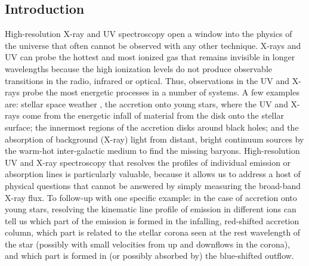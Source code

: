 \documentclass[12pt]{spieman}  %
\begin{document}
\begin{spacing}{1}

\section{Introduction}
\label{sect:intro}  %
High-resolution X-ray and UV spectroscopy open a window into the physics of the universe that often cannot be observed with any other technique. X-rays and UV can probe the hottest and most ionized gas that remains invisible in longer wavelengths because the high ionization levels do not produce observable transitions in the radio, infrared or optical. Thus, observations in the UV and X-rays probe the most energetic processes in a number of systems. A few examples are: stellar space weather \cite{2022AN....34320019B}, the accretion onto young stars, where the UV and X-rays come from the energetic infall of material from the disk onto the stellar surface; the innermost regions of the accretion disks around black holes; and the absorption of background (X-ray) light from distant, bright continuum sources by the warm-hot inter-galactic medium to find the missing baryons\cite{10.1117/12.2231193}. High-resolution UV and X-ray spectroscopy that resolves the profiles of individual emission or absorption lines is particularly valuable, because it allows us to address a host of physical questions that cannot be answered by simply measuring the broad-band X-ray flux.
To follow-up with one specific example: in the case of accretion onto young stars, resolving the kinematic line profile of emission in different ions can tell us which part of the emission is formed in the infalling, red-shifted accretion column, which part is related to the stellar corona seen at the rest wavelength of the star (possibly with small velocities from up and downflows in the corona), and which part is formed in (or possibly absorbed by) the blue-shifted outflow.


\end{spacing}
\end{document}
